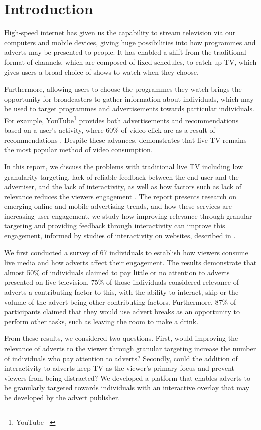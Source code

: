 \section{Introduction}
High-speed internet has given us the capability to stream television via our computers and mobile devices, giving huge possibilities into how programmes and adverts may be presented to people. It has enabled a shift from the traditional format of channels, which are composed of fixed schedules, to catch-up TV, which gives users a broad choice of shows to watch when they choose. 

Furthermore, allowing users to choose the programmes they watch brings the opportunity for broadcasters to gather information about individuals, which may be used to target programmes and advertisements towards particular individuals. For example, YouTube\footnote{YouTube -- } provides both advertisements and recommendations based on a user's activity, where 60\% of video click are as a result of recommendations \citep{davidson2012}. Despite these advances, \citet{three-screen} demonstrates that live TV remains the most popular method of video consumption.

In this report, we discuss the problems with traditional live TV including low granularity targeting, lack of reliable feedback between the end user and the advertiser, and the lack of interactivity, as well as how factors such as lack of relevance reduces the viewers engagement \citep{advertising_engagement}. The report presents research on emerging online and mobile advertising trends, and how these services are increasing user engagement. we study how improving relevance through granular targeting and providing feedback through interactivity can improve this engagement, informed by studies of interactivity on websites, described in \citet{Teo2003281}.

We first conducted a survey of 67 individuals to establish how viewers consume live media and how adverts affect their engagement. The results demonstrate that almost 50\% of individuals claimed to pay little or no attention to adverts presented on live television. 75\% of those individuals considered relevance of adverts a contributing factor to this, with the ability to interact, skip or the volume of the advert being other contributing factors. Furthermore, 87\% of participants claimed that they would use advert breaks as an opportunity to perform other tasks, such as leaving the room to make a drink.

From these results, we considered two questions. First, would improving the relevance of adverts to the viewer through granular targeting increase the number of individuals who pay attention to adverts? Secondly, could the addition of interactivity to adverts keep TV as the viewer's primary focus and prevent viewers from being distracted? We developed a platform that enables adverts to be granularly targeted towards individuals with an interactive overlay that may be developed by the advert publisher. 

